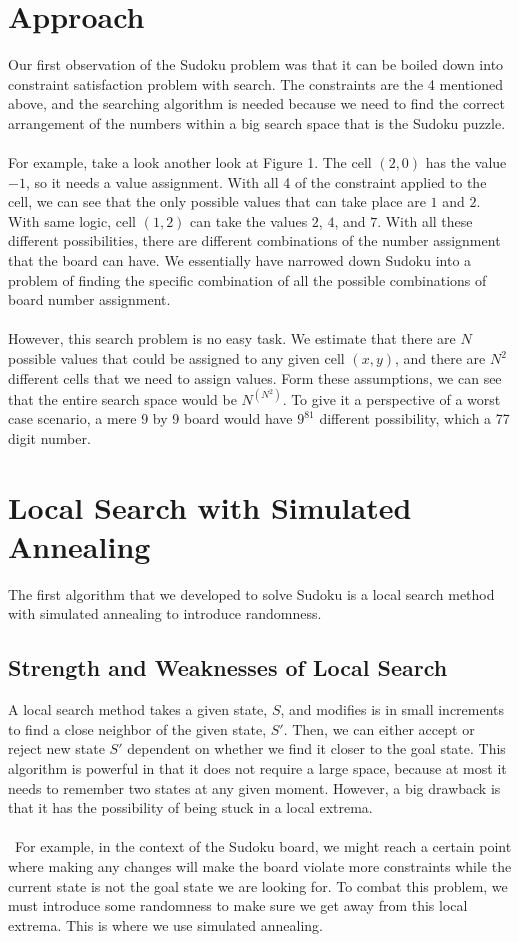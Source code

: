 \documentclass[12pt, a4paper]{article}
\begin{document}
	\section{Approach}
		Our first observation of the Sudoku problem was that it can be boiled down into constraint satisfaction problem with search. The constraints are the 4 mentioned above, and the searching algorithm is needed because we need to find the correct arrangement of the numbers within a big search space that is the Sudoku puzzle. \\\\
		For example, take a look another look at Figure 1. The cell $(2, 0)$ has the value $-1$, so it needs a value assignment. With all 4 of the constraint applied to the cell, we can see that the only possible values that can take place are $1$ and $2$. With same logic, cell $(1, 2)$ can take the values $2$, $4$, and  $7$. With all these different possibilities, there are different combinations of the number assignment that the board can have. We essentially have narrowed down Sudoku into a problem of finding the specific combination of all the possible combinations of board number assignment.\\\\
		However, this search problem is no easy task. We estimate that there are $N$ possible values that could be assigned to any given cell $(x, y)$, and there are $N^2$ different cells that we need to assign values. Form these assumptions, we can see that the entire search space would be $N^{(N^2)}$. To give it a perspective of a worst case scenario, a mere 9 by 9 board would have $9^{81}$ different possibility, which a 77 digit number. 
	\section{Local Search with Simulated Annealing}
		The first algorithm that we developed to solve Sudoku is a local search method with simulated annealing to introduce randomness. 
		\subsection{Strength and Weaknesses of Local Search}
			A local search method takes a given state, $S$, and modifies is in small increments to find a close neighbor of the given state, $S'$. Then, we can either accept or reject new state $S'$ dependent on whether we find it closer to the goal state. This algorithm is powerful in that it does not require a large space, because at most it needs to remember two states at any given moment. However, a big drawback is that it has the possibility of being stuck in a local extrema.\\\\\
			For example, in the context of the Sudoku board, we might reach a certain point where making any changes will make the board violate more constraints while the current state is not the goal state we are looking for. To combat this problem, we must introduce some randomness to make sure we get away from this local extrema. This is where we use simulated annealing.
\end{document}
